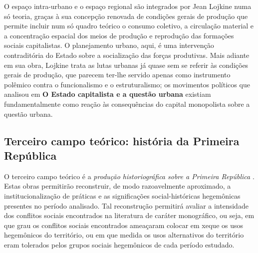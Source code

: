 O espaço intra-urbano e o espaço regional são integrados por Jean Lojkine numa só teoria, graças à sua concepção renovada de condições gerais de produção que permite incluir num só quadro teórico o consumo coletivo, a circulação material e a concentração espacial dos meios de produção e reprodução das formações sociais capitalistas. O planejamento urbano, aqui, é uma intervenção contraditória do Estado sobre a socialização das forças produtivas. Mais adiante em sua obra, Lojkine trata as lutas urbanas já quase sem se referir às condições gerais de produção, que parecem ter-lhe servido apenas como instrumento polêmico contra o funcionalismo e o estruturalismo; os movimentos políticos que analisou em \textbf{O Estado capitalista e a questão urbana} existiam fundamentalmente como reação às consequências do capital monopolista sobre a questão urbana.

\subsection{Terceiro campo teórico: história da Primeira República}
\label{subsec:histprirep}

O terceiro campo teórico é a \textit{produção historiográfica sobre a Primeira República} \cite{BRUNO1967, carone_evolucao_1977, CARONE1970inst, faoro_donos_2001, fausto_hgcb1_1977, fausto_sociedade_1977, freyre_ordem_2004, janotti_subversivos_1986, leal_coronelismo_2012, LINS1988coro, PEDROSA1966a, PEDROSA1966b, pires_eleicoes_1995, saes_classemedia_1975, silva_historiaeconomica_2002}. Estas obras permitirão reconstruir, de modo razoavelmente aproximado, a institucionalização de práticas \cite{BERNARDO1991} e as significações social-históricas \cite{CASTORIADIS1982} hegemônicas presentes no período analisado. Tal reconstrução permitirá avaliar a intensidade dos conflitos sociais encontrados na literatura de caráter monográfico, ou seja, em que grau os conflitos sociais encontrados ameaçaram colocar em xeque os usos hegemônicos do território, ou em que medida os usos alternativos do território eram tolerados pelos grupos sociais hegemônicos de cada período estudado.

